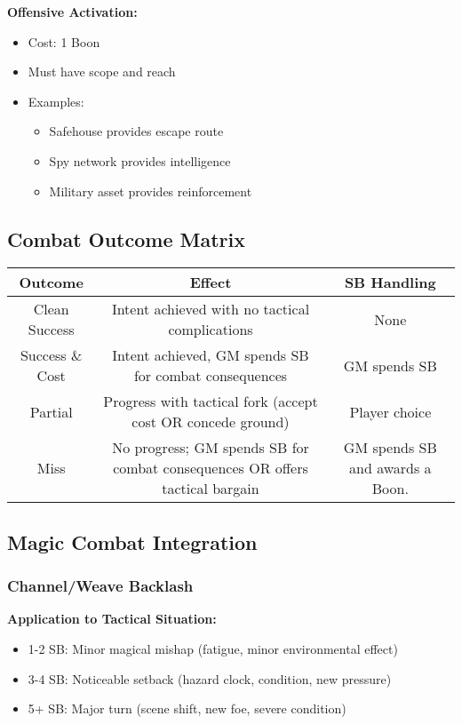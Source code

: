 \textbf{Offensive Activation:}
\begin{itemize}[leftmargin=*]
    \item Cost: 1 Boon
    \item Must have scope and reach
    \item Examples:
    \begin{itemize}
        \item Safehouse provides escape route
        \item Spy network provides intelligence
        \item Military asset provides reinforcement
    \end{itemize}
\end{itemize}

\subsection{Combat Outcome Matrix}
\begin{center}
\begin{tabular}{|c|c|c|}
\hline
\textbf{Outcome} & \textbf{Effect} & \textbf{SB Handling} \\
\hline
Clean Success & Intent achieved with no tactical complications & None \\
\hline
Success \& Cost & Intent achieved, GM spends SB for combat consequences & GM spends SB \\
\hline
Partial & Progress with tactical fork (accept cost OR concede ground) & Player choice \\
\hline
Miss & No progress; GM spends SB for combat consequences OR offers tactical bargain & GM spends SB and awards a Boon. \\
\hline
\end{tabular}
\end{center}

\subsection{Magic Combat Integration}

\subsubsection{Channel/Weave Backlash}
\textbf{Application to Tactical Situation:}
\begin{itemize}[leftmargin=*]
    \item 1-2 SB: Minor magical mishap (fatigue, minor environmental effect)
    \item 3-4 SB: Noticeable setback (hazard clock, condition, new pressure)
    \item 5+ SB: Major turn (scene shift, new foe, severe condition)
\end{itemize}

